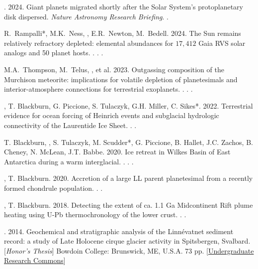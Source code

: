 \begin{etaremune} [itemsep=4pt, leftmargin=3ex]
    \item \ghedwards. 2024. Giant planets migrated shortly after the Solar System’s protoplanetary disk dispersed. \textit{Nature Astronomy Research Briefing}. .
    
    \item R.~Rampalli*, M.K.~Ness, \ghedwards, E.R.~Newton, M.~Bedell. 2024. The Sun remains relatively refractory depleted: elemental abundances for $17,412$ Gaia RVS solar analogs and 50 planet hosts. . . .
    
    \item M.A.~Thompson, M.~Telus, \ghedwards, et al. 2023. Outgassing composition of the Murchison meteorite: implications for volatile depletion of planetesimals and interior-atmosphere connections for terrestrial exoplanets. . . .
    
    \item \ghedwards, T. Blackburn, G. Piccione, S. Tulaczyk, G.H. Miller, C. Sikes*. 2022. Terrestrial evidence for ocean forcing of Heinrich events and subglacial hydrologic connectivity of the Laurentide Ice Sheet. . .
    
    \item T. Blackburn, \ghedwards, S. Tulaczyk, M. Scudder*, G. Piccione, B. Hallet, J.C. Zachos, B. Cheney, N. McLean, J.T. Babbe. 2020. Ice retreat in Wilkes Basin of East Antarctica during a warm interglacial. . . .
    
    \item \ghedwards, T. Blackburn. 2020. Accretion of a large LL parent planetesimal from a recently formed chondrule population. . .
    
    \item \ghedwards, T. Blackburn. 2018. Detecting the extent of ca. 1.1 Ga Midcontinent Rift plume heating using U-Pb thermochronology of the lower crust. . .
    


\end{etaremune}

\begin{etaremune} [itemsep=4pt, leftmargin=3ex]
    \item \ghedwards. 2014. Geochemical and stratigraphic analysis of the Linnévatnet sediment record: a study of Late Holocene cirque glacier activity in Spitsbergen, Svalbard. [\textit{Honor’s Thesis}] Bowdoin College: Brunswick, ME, U.S.A. 73 pp. [\href{https://digitalcommons.bowdoin.edu/honorsprojects/12/}{Undergraduate Research Commons}]
\end{etaremune}

